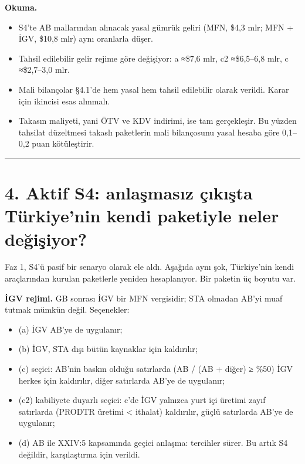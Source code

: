\endgroup

\textbf{Okuma.}

\begin{itemize}
\tightlist
\item
  S4'te AB mallarından alınacak yasal gümrük geliri (MFN, \$4,3 mlr; MFN + İGV, \$10,8 mlr) aynı oranlarla düşer.
\item
  Tahsil edilebilir gelir rejime göre değişiyor: a ≈\$7,6 mlr, c2 ≈\$6,5--6,8 mlr, c ≈\$2,7--3,0 mlr.
\item
  Mali bilançolar §4.1'de hem yasal hem tahsil edilebilir olarak verildi. Karar için ikincisi esas alınmalı.
\item
  Takasın maliyeti, yani ÖTV ve KDV indirimi, ise tam gerçekleşir. Bu yüzden tahsilat düzeltmesi takaslı paketlerin mali bilançosunu yasal hesaba göre 0,1--0,2 puan kötüleştirir.
\end{itemize}

\begin{center}\rule{0.5\linewidth}{0.5pt}\end{center}

\hypertarget{02a_politika_uzayi-4-aktif-s4-anlaux15fmasux131z-uxe7ux131kux131ux15fta-tuxfcrkiyenin-kendi-paketiyle-neler-deux11fiux15fiyor}{%
\section{4. Aktif S4: anlaşmasız çıkışta Türkiye'nin kendi paketiyle neler değişiyor?}\label{02a_politika_uzayi-4-aktif-s4-anlaux15fmasux131z-uxe7ux131kux131ux15fta-tuxfcrkiyenin-kendi-paketiyle-neler-deux11fiux15fiyor}}

Faz 1, S4'ü pasif bir senaryo olarak ele aldı. Aşağıda aynı şok, Türkiye'nin kendi araçlarından kurulan paketlerle yeniden hesaplanıyor. Bir paketin üç boyutu var.

\textbf{İGV rejimi.} GB sonrası İGV bir MFN vergisidir; STA olmadan AB'yi muaf tutmak mümkün değil. Seçenekler:

\begin{itemize}
\tightlist
\item
  (a) İGV AB'ye de uygulanır;
\item
  (b) İGV, STA dışı bütün kaynaklar için kaldırılır;
\item
  (c) seçici: AB'nin baskın olduğu satırlarda (AB / (AB + diğer) ≥ \%50) İGV herkes için kaldırılır, diğer satırlarda AB'ye de uygulanır;
\item
  (c2) kabiliyete duyarlı seçici: c'de İGV yalnızca yurt içi üretimi zayıf satırlarda (PRODTR üretimi \textless{} ithalat) kaldırılır, güçlü satırlarda AB'ye de uygulanır;
\item
  (d) AB ile XXIV:5 kapsamında geçici anlaşma: tercihler sürer. Bu artık S4 değildir, karşılaştırma için verildi.
\end{itemize}

